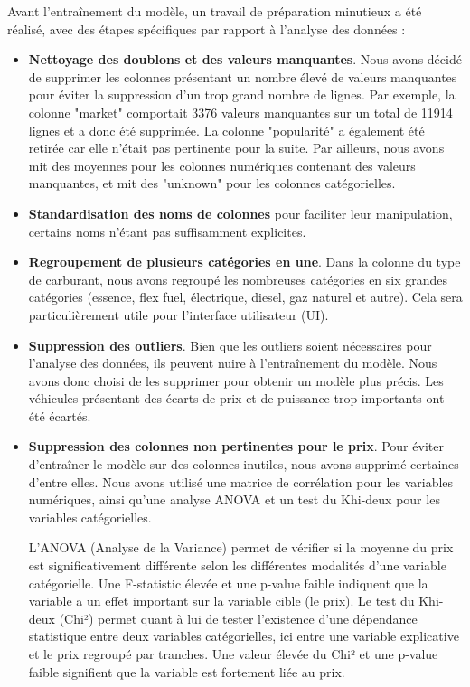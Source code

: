 \documentclass[12pt]{report}
\begin{document}
Avant l'entraînement du modèle, un travail de préparation minutieux a été réalisé, avec des étapes spécifiques par rapport à l'analyse des données :
\begin{itemize}
    \item \textbf{Nettoyage des doublons et des valeurs manquantes}. Nous avons décidé de supprimer les colonnes présentant un nombre élevé de valeurs manquantes pour éviter la suppression d'un trop grand nombre de lignes. Par exemple, la colonne "market" comportait 3376 valeurs manquantes sur un total de 11914 lignes et a donc été supprimée. La colonne "popularité" a également été retirée car elle n'était pas pertinente pour la suite. Par ailleurs, nous avons mit des moyennes pour les colonnes numériques contenant des valeurs manquantes, et mit des "unknown" pour les colonnes catégorielles. 
    \item \textbf{Standardisation des noms de colonnes} pour faciliter leur manipulation, certains noms n'étant pas suffisamment explicites.
    \item \textbf{Regroupement de plusieurs catégories en une}. Dans la colonne du type de carburant, nous avons regroupé les nombreuses catégories en six grandes catégories (essence, flex fuel, électrique, diesel, gaz naturel et autre). Cela sera particulièrement utile pour l'interface utilisateur (UI).
    \item \textbf{Suppression des outliers}. Bien que les outliers soient nécessaires pour l'analyse des données, ils peuvent nuire à l'entraînement du modèle. Nous avons donc choisi de les supprimer pour obtenir un modèle plus précis. Les véhicules présentant des écarts de prix et de puissance trop importants ont été écartés.
    \item \textbf{Suppression des colonnes non pertinentes pour le prix}. Pour éviter d'entraîner le modèle sur des colonnes inutiles, nous avons supprimé certaines d'entre elles. Nous avons utilisé une matrice de corrélation pour les variables numériques, ainsi qu'une analyse ANOVA et un test du Khi-deux pour les variables catégorielles. 
    
    L'ANOVA (Analyse de la Variance) permet de vérifier si la moyenne du prix est significativement différente selon les différentes modalités d'une variable catégorielle. Une F-statistic élevée et une p-value faible indiquent que la variable a un effet important sur la variable cible (le prix).  
    Le test du Khi-deux (Chi²) permet quant à lui de tester l'existence d'une dépendance statistique entre deux variables catégorielles, ici entre une variable explicative et le prix regroupé par tranches. Une valeur élevée du Chi² et une p-value faible signifient que la variable est fortement liée au prix.


\end{itemize}
\end{document}
